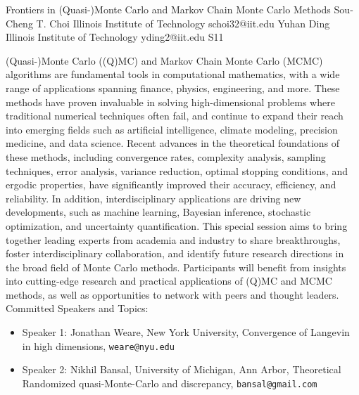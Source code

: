 

\clearpage

\begin{session}
 {Frontiers in (Quasi-)Monte Carlo and Markov Chain Monte Carlo Methods}%
 {Sou-Cheng T.  Choi}%
 {Illinois Institute of Technology}%
 {schoi32@iit.edu}%
 {Yuhan Ding}%
 {Illinois Institute of Technology}%
 {yding2@iit.edu}%
 {S11}%
{}

 (Quasi-)Monte Carlo ((Q)MC) and Markov Chain Monte Carlo (MCMC) algorithms are fundamental tools in computational mathematics, with a wide range of applications spanning finance, physics, engineering, and more. These methods have proven invaluable in solving high-dimensional problems where traditional numerical techniques often fail, and continue to expand their reach into emerging fields such as artificial intelligence, climate modeling, precision medicine, and data science.
 Recent advances in the theoretical foundations of these methods, including convergence rates, complexity analysis, sampling techniques, error analysis, variance reduction, optimal stopping conditions, and ergodic properties, have significantly improved their accuracy, efficiency, and reliability. In addition, interdisciplinary applications are driving new developments, such as machine learning, Bayesian inference, stochastic optimization, and uncertainty quantification.
 This special session aims to bring together leading experts from academia and industry to share breakthroughs, foster interdisciplinary collaboration, and identify future research directions in the broad field of Monte Carlo methods. Participants will benefit from insights into cutting-edge research and practical applications of (Q)MC and MCMC methods, as well as opportunities to network with peers and thought leaders.
 Committed Speakers and Topics:
 \begin{itemize}
 \item Speaker 1: Jonathan Weare, New York University, Convergence of Langevin in high dimensions, \texttt{weare@nyu.edu}
 \item Speaker 2: Nikhil Bansal, University of Michigan, Ann Arbor, Theoretical Randomized quasi-Monte-Carlo and discrepancy, \texttt{bansal@gmail.com}

\end{itemize}
\end{session}
